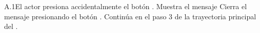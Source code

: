 \begin{UCtrayectoriaA}{A.1}{El actor presiona accidentalmente el botón  \IUbutton{+}.}
	\UCpaso Muestra el mensaje 
	\UCpaso[\UCactor] Cierra el mensaje presionando el botón .
	\UCpaso Continúa en el paso 3 de la trayectoria principal del .
\end{UCtrayectoriaA}